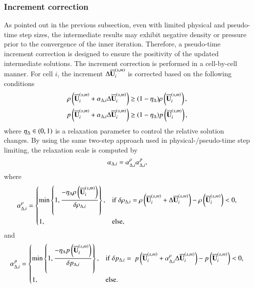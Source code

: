 \subsubsection{Increment correction}
\label{ssec:increment-correction}

As pointed out in the previous subsection, even with limited physical and pseudo-time step sizes, the intermediate results may exhibit negative density or pressure prior to the convergence of the inner iteration.
Therefore, a pseudo-time increment correction is designed to ensure the positivity of the updated intermediate solutions. The increment correction is performed in a cell-by-cell manner.
For cell $i$, the increment $\mathrm\Delta \overline{\mathbf{U}}_i^{\left(s,m\right)}$ is corrected based on the following conditions
\begin{equation}
    \label{eq:ppLimitInc}
    \begin{aligned}
        \rho\left(\overline{\mathbf{U}}_i^{\left(s,m\right)} + \alpha_{\mathrm\Delta,i} \mathrm\Delta \overline{\mathbf{U}}_i^{\left(s,m\right)}\right)
         & \geq
        (1- \eta_\mathrm\Delta)
        \rho\left(\overline{\mathbf{U}}_i^{\left(s,m\right)}\right), \\
        p\left(\overline{\mathbf{U}}_i^{\left(s,m\right)} + \alpha_{\mathrm\Delta,i} \mathrm\Delta \overline{\mathbf{U}}_i^{\left(s,m\right)}\right)
         & \geq
        (1- \eta_\mathrm\Delta)
        p\left(\overline{\mathbf{U}}_i^{\left(s,m\right)}\right),
    \end{aligned}
\end{equation}
where $\eta_\mathrm\Delta \in (0,1)$ is a relaxation parameter to control the relative solution changes.
By using the same two-step approach used in physical-/pseudo-time step limiting, the relaxation scale is computed by
\begin{equation}
\label{eq:alpha-inc}
    \alpha_{\mathrm\Delta,i}= \alpha_{\mathrm\Delta,i}^{\rho} \alpha_{\mathrm\Delta,i}^{p},
\end{equation}
where
\begin{equation}
\label{eq:alpha-inc-rho}
    \alpha_{\mathrm\Delta,i}^{\rho} = \begin{dcases}
        \min\left\{1, \dfrac{-\eta_\mathrm\Delta \rho\left(\overline{\mathbf{U}}^{\left(s,m\right)}_i\right)}{\delta \rho_{\mathrm\Delta,i}} \right\}, & \mathrm{if} \ \delta \rho_{\mathrm\Delta,i} = \rho\left(\overline{\mathbf{U}}^{\left(s,m\right)}_i +\mathrm\Delta \overline{\mathbf{U}}_i^{\left(s,m\right)}\right)  -\rho\left(\overline{\mathbf{U}}^{\left(s,m\right)}_i\right) < 0, \\
        1, &
        \mathrm{else},
    \end{dcases}
\end{equation}
and
\begin{equation}
\label{eq:alpha-inc-p}
    \alpha_{\mathrm\Delta,i}^{p} = \begin{dcases}
        \min\left\{1, \dfrac{-\eta_\mathrm\Delta p \left(\overline{\mathbf{U}}^{\left(s,m\right)}_i\right)}{\delta p_{\mathrm\Delta,i}} \right\}, & \mathrm{if} \ \delta p_{\mathrm\Delta,i} = \ p \left(\overline{\mathbf{U}}^{\left(s,m\right)}_i + \alpha_{\mathrm\Delta,i}^{\rho} \mathrm\Delta \overline{\mathbf{U}}_i^{\left(s,m\right)}\right) - p \left(\overline{\mathbf{U}}^{\left(s,m\right)}_i\right) < 0, \\
        1, &
        \mathrm{else}.
    \end{dcases}
\end{equation}
